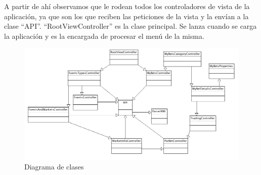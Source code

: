   A partir de ahí observamos que le rodean todos los controladores de vista de la aplicación, ya que son los que reciben las peticiones de la vista y la envían a la clase ``API''. ``RootViewController'' es la clase principal. Se lanza cuando se carga la aplicación y es la encargada de procesar el menú de la misma.

 \begin{figure}[h!]
    \centering
       \includegraphics[width=1.2\textwidth]{./images/DiagramaDeClases3.png}
     \caption{Diagrama de clases}
   \label{fig:Diagrama de clases}
\end{figure}

